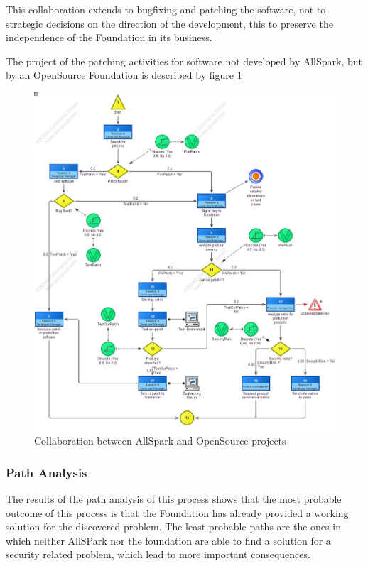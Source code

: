 This collaboration extends to bugfixing and patching the software, not to
strategic decisions on the direction of the development, this to preserve
the independence of the Foundation in its business.

The project of the patching activities for software not developed by
AllSpark, but by an OpenSource Foundation is described by figure
\ref{2img:found_coop}

\begin{figure}[!ht]
\begin{centering}
\includegraphics[scale=0.40]{assign2/adonis/imgs/coop.jpg}
\caption{Collaboration between AllSpark and OpenSource projects}
\label{2img:found_coop}
\end{centering}
\end{figure}

\subsubsection{Path Analysis}
The results of the path analysis of this process shows that the most
probable outcome of this process is that the Foundation has already
provided a working solution for the discovered problem.
The least probable paths are the ones in which neither AllSPark nor the
foundation are able to find a solution for a security related problem,
which lead to more important consequences.

